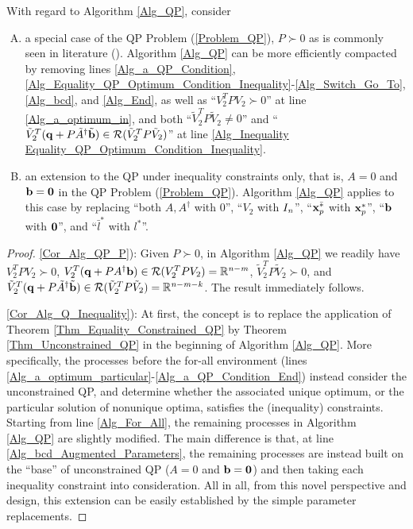 \documentclass{imaman}
\newcommand{\bfb}{{\bf b}}
\newcommand{\bfx}{{\bf x}}
\newcommand{\bfq}{{\bf q}}
\newcommand{\bfzero}{{\bf 0}}
\newcommand{\real}{\mathbb{R}}
\newcommand{\calR}{{\mathcal R}}
\newcommand{\itk}{{\it k}}
\newcommand{\itm}{{\it m}}
\newcommand{\itn}{{\it n}}
\numberwithin{equation}{section}
\begin{document}
\begin{corollary} With regard to Algorithm {\rm\ref{Alg_QP}}, consider
\begin{enumerate}[A)]
\item\label{Cor_Alg_QP_P} a special case of the QP Problem {\rm(\ref{Problem_QP})}, $P\succ 0$ as is commonly seen in literature ({\rm\cite{Lu(Ye):03(16)}}). Algorithm {\rm\ref{Alg_QP}} can be more efficiently compacted by removing lines {\rm\ref{Alg_a_QP_Condition}}, {\rm\ref{Alg_Equality_QP_Optimum_Condition_Inequality}}-{\rm\ref{Alg_Switch_Go_To}}, {\rm\ref{Alg_bcd}}, and {\rm\ref{Alg_End}}, as well as ``$V_2^TPV_2\succ 0$'' at line {\rm\ref{Alg_a_optimum_in}}, and both ``$\tilde V_2^TP\tilde V_2\ne 0$'' and ``$\tilde V_2^T(\bfq+P\tilde A^\dagger\tilde\bfb)\in\calR(\tilde V_2^TP\tilde V_2)$'' at line {\rm\ref{Alg_Inequality Equality_QP_Optimum_Condition_Inequality}}.
\item\label{Cor_Alg_Q_Inequality} an extension to the QP under inequality constraints only, that is, $A=0$ and $\bfb=\bfzero$ in the QP Problem {\rm(\ref{Problem_QP})}. Algorithm {\rm\ref{Alg_QP}} applies to this case by replacing ``both $A, A^\dagger$ with $0$'', ``$V_2$ with $I_\itn$'', ``$\bfx_p^{\bar *}$ with $\bfx_p^*$'', ``$\bfb$ with $\bfzero$'', and ``$\bar l^*$ with $l^*$''.
\end{enumerate}
\label{Cor_Alg_QP}
\end{corollary}

\begin{proof}
\ref{Cor_Alg_QP_P}): Given $P\succ 0$, in Algorithm \ref{Alg_QP} we readily have $V_2^TPV_2\succ 0$, $V_2^T(\bfq+PA^\dagger\bfb)\in\calR(V_2^TPV_2)=\real^{\itn-\itm}$, $\tilde V_2^TP\tilde V_2\succ 0$, and $\tilde V_2^T(\bfq+P\tilde A^\dagger\tilde\bfb)\in\calR(\tilde V_2^TP\tilde V_2)=\real^{\itn-\itm-\itk}$. The result immediately follows.

\ref{Cor_Alg_Q_Inequality}): At first, the concept is to replace the application of Theorem \ref{Thm_Equality_Constrained_QP} by Theorem \ref{Thm_Unconstrained_QP} in the beginning of Algorithm \ref{Alg_QP}. More specifically, the processes before the for-all environment (lines \ref{Alg_a_optimum_particular}-\ref{Alg_a_QP_Condition_End}) instead consider the unconstrained QP, and determine whether the associated unique optimum, or the particular solution of nonunique optima, satisfies the (inequality) constraints. Starting from line \ref{Alg_For_All}, the remaining processes in Algorithm \ref{Alg_QP} are slightly modified. The main difference is that, at line \ref{Alg_bcd_Augmented_Parameters}, the remaining processes are instead built on the ``base'' of unconstrained QP ($A=0$ and $\bfb=\bfzero$) and then taking each inequality constraint into consideration. All in all, from this novel perspective and design, this extension can be easily established by the simple parameter replacements.
\end{proof}
\end{document}
